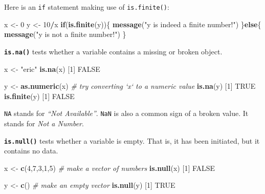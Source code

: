 \documentclass[]{book}
\newenvironment{Shaded}{\begin{snugshade}}{\end{snugshade}}
\newcommand{\CommentTok}[1]{\textcolor[rgb]{0.56,0.35,0.01}{\textit{#1}}}
\newcommand{\ControlFlowTok}[1]{\textcolor[rgb]{0.13,0.29,0.53}{\textbf{#1}}}
\newcommand{\DecValTok}[1]{\textcolor[rgb]{0.00,0.00,0.81}{#1}}
\newcommand{\KeywordTok}[1]{\textcolor[rgb]{0.13,0.29,0.53}{\textbf{#1}}}
\newcommand{\NormalTok}[1]{#1}
\newcommand{\OperatorTok}[1]{\textcolor[rgb]{0.81,0.36,0.00}{\textbf{#1}}}
\newcommand{\OtherTok}[1]{\textcolor[rgb]{0.56,0.35,0.01}{#1}}
\newcommand{\StringTok}[1]{\textcolor[rgb]{0.31,0.60,0.02}{#1}}
\begin{document}
Here is an \texttt{if} statement making use of \texttt{is.finite()}:

\begin{Shaded}
\begin{Highlighting}[]
\NormalTok{x <-}\StringTok{ }\DecValTok{0}
\NormalTok{y <-}\StringTok{ }\DecValTok{10}\OperatorTok{/}\NormalTok{x}
\ControlFlowTok{if}\NormalTok{(}\KeywordTok{is.finite}\NormalTok{(y))\{}
  \KeywordTok{message}\NormalTok{(}\StringTok{"y is indeed a finite number!"}\NormalTok{)}
\NormalTok{\}}\ControlFlowTok{else}\NormalTok{\{}
  \KeywordTok{message}\NormalTok{(}\StringTok{"y is not a finite number!"}\NormalTok{)}
\NormalTok{\}}
\end{Highlighting}
\end{Shaded}

\textbf{\texttt{is.na()}} tests whether a variable contains a missing or broken object.

\begin{Shaded}
\begin{Highlighting}[]
\NormalTok{x <-}\StringTok{ "eric"}
\KeywordTok{is.na}\NormalTok{(x)}
\NormalTok{[}\DecValTok{1}\NormalTok{] }\OtherTok{FALSE}

\NormalTok{y <-}\StringTok{ }\KeywordTok{as.numeric}\NormalTok{(x) }\CommentTok{# try converting `x` to a numeric value}
\KeywordTok{is.na}\NormalTok{(y)}
\NormalTok{[}\DecValTok{1}\NormalTok{] }\OtherTok{TRUE}
\KeywordTok{is.finite}\NormalTok{(y)}
\NormalTok{[}\DecValTok{1}\NormalTok{] }\OtherTok{FALSE}
\end{Highlighting}
\end{Shaded}

\texttt{NA} stands for \emph{``Not Available''}. \texttt{NaN} is also a common sign of a broken value. It stands for \emph{Not a Number}.

\textbf{\texttt{is.null()}} tests whether a variable is empty. That is, it has been initiated, but it contains no data.

\begin{Shaded}
\begin{Highlighting}[]
\NormalTok{x <-}\StringTok{ }\KeywordTok{c}\NormalTok{(}\DecValTok{4}\NormalTok{,}\DecValTok{7}\NormalTok{,}\DecValTok{3}\NormalTok{,}\DecValTok{1}\NormalTok{,}\DecValTok{5}\NormalTok{) }\CommentTok{# make a vector of numbers}
\KeywordTok{is.null}\NormalTok{(x)}
\NormalTok{[}\DecValTok{1}\NormalTok{] }\OtherTok{FALSE}

\NormalTok{y <-}\StringTok{ }\KeywordTok{c}\NormalTok{() }\CommentTok{# make an empty vector}
\KeywordTok{is.null}\NormalTok{(y)}
\NormalTok{[}\DecValTok{1}\NormalTok{] }\OtherTok{TRUE}
\end{Highlighting}
\end{Shaded}
\end{document}
